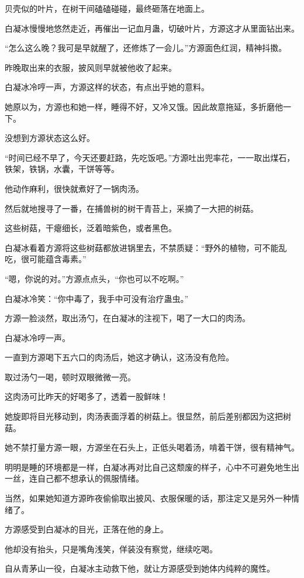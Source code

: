 \begin{this_body}
贝壳似的叶片，在树干间磕磕碰碰，最终砸落在地面上。

白凝冰慢慢地悠然走近，再催出一记血月蛊，切破叶片，方源这才从里面钻出来。

“怎么这么晚？我可是早就醒了，还修炼了一会儿。”方源面色红润，精神抖擞。

昨晚取出来的衣服，披风则早就被他收了起来。

白凝冰冷哼一声，方源这样的状态，有点出乎她的意料。

她原以为，方源也和她一样，睡得不好，又冷又饿。因此故意拖延，多折磨他一下。

没想到方源状态这么好。

“时间已经不早了，今天还要赶路，先吃饭吧。”方源吐出兜率花，一一取出煤石，铁架，铁锅，水囊，干饼等等。

他动作麻利，很快就煮好了一锅肉汤。

然后就地搜寻了一番，在捕兽树的树干青苔上，采摘了一大把的树菇。

这些树菇，干瘪细长，泛着暗紫色，或者黑色。

白凝冰看着方源将这些树菇都放进锅里去，不禁质疑：“野外的植物，可不能乱吃，很可能蕴含毒素。”

“嗯，你说的对。”方源点点头，“你也可以不吃啊。”

白凝冰冷笑：“你中毒了，我手中可没有治疗蛊虫。”

方源一脸淡然，取出汤勺，在白凝冰的注视下，喝了一大口的肉汤。

白凝冰冷哼一声。

一直到方源喝下五六口的肉汤后，她这才确认，这汤没有危险。

取过汤勺一喝，顿时双眼微微一亮。

这肉汤可比昨天的好喝多了，透着一股鲜味！

她旋即将目光移动到，肉汤表面浮着的树菇上。很显然，前后差别都因为这把树菇。

她不禁打量方源一眼，方源坐在石头上，正低头喝着汤，啃着干饼，很有精神气。

明明是睡的环境都是一样，白凝冰再对比自己这颓废的样子，心中不可避免地生出一丝，连自己都不想承认的佩服情绪。

当然，如果她知道方源昨夜偷偷取出披风、衣服保暖的话，那注定又是另外一种情绪了。

方源感受到白凝冰的目光，正落在他的身上。

他却没有抬头，只是嘴角浅笑，佯装没有察觉，继续吃喝。

自从青茅山一役，白凝冰主动救下他，就让方源感受到她体内纯粹的魔性。


\end{this_body}
